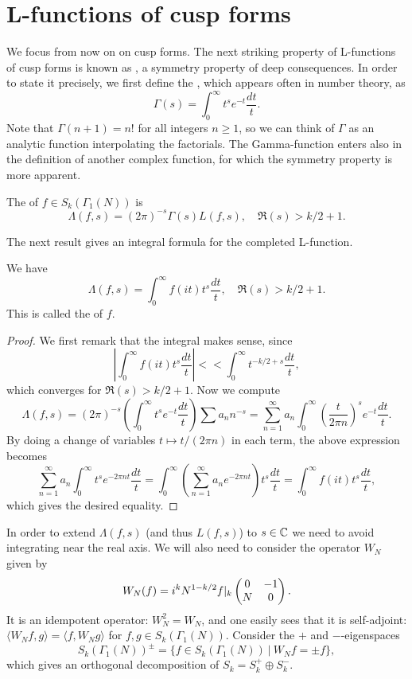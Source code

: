 \section{L-functions of cusp forms}
We focus from now on on cusp forms. The next striking property of L-functions of cusp forms is known as , a symmetry property of deep consequences. In order to state it precisely, we first define the , which appears often in number theory, as
\[
\Gamma(s)=\int_0^\infty t^s e^{-t}\frac{dt}{t}.
\]
Note that $\Gamma(n+1)= n!$ for all integers $n\geq 1$, so we can think of $\Gamma$ as an analytic function interpolating the factorials. The Gamma-function enters also in the definition of another complex function, for which the symmetry property is more apparent.
\begin{definition}
  The  of $f\in S_k(\Gamma_1(N))$ is
\[
\Lambda(f,s)=(2\pi)^{-s}\Gamma(s)L(f,s),\quad \Re(s)>k/2+1.
\]
\end{definition}
The next result gives an integral formula for the completed L-function.
\begin{proposition}
  We have
\[
\Lambda(f,s)=\int_0^\infty f(it)t^s\frac{dt}{t},\quad \Re(s)>k/2+1.
\]
This is called the  of $f$.
\end{proposition}
\begin{proof}
  We first remark that the integral makes sense, since
\[
|\int_0^\infty f(it)t^s\frac{dt}{t}| << \int_0^\infty t^{-k/2+s} \frac{dt}{t},
\]
which converges for $\Re(s)>k/2+1$. Now we compute
\[
\Lambda(f,s) = (2\pi)^{-s} \left(\int_0^\infty t^s e^{-t}\frac{dt}{t}\right)\sum a_n n^{-s} = \sum_{n=1}^\infty a_n\int_0^\infty \left(\frac{t}{2\pi n}\right)^s e^{-t}\frac{dt}{t}.
\]
By doing a change of variables $t\mapsto t/(2\pi n)$ in each term, the above expression becomes
\[
\sum_{n=1}^\infty a_n\int_0^\infty t^s e^{-2\pi n t}\frac{dt}{t} = \int_0^\infty \left(\sum_{n=1}^\infty a_n e^{-2\pi nt}\right) t^s\frac{dt}{t} = \int_0^\infty f(it)t^s\frac{dt}{t},
\]
which gives the desired equality.
\end{proof}

In order to extend $\Lambda(f,s)$ (and thus $L(f,s)$) to $s\in\mathbb{C}$ we need to avoid integrating near the real axis. We will also need to consider the operator $W_N$ given by
\[
W_N(f)= i^k N^{1-k/2} f|_k \left(\begin{matrix}0&-1\\N&0\end{matrix}\right).
\]
It is an idempotent operator: $W_N^2=W_N$, and one easily sees that it is self-adjoint: $\langle W_Nf,g\rangle = \langle f,W_Ng\rangle$ for $f,g\in S_k(\Gamma_1(N))$. Consider the $+$ and $-$-eigenspaces
\[
S_k(\Gamma_1(N))^{\pm} = \{f\in S_k(\Gamma_1(N)) ~|~ W_Nf = \pm f\},
\]
which gives an orthogonal decomposition of $S_k = S_k^+\oplus S_k^-$.

